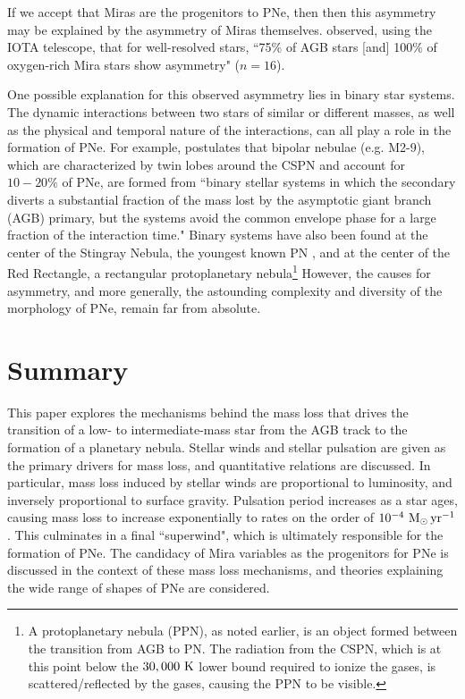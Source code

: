 \documentclass[twocolumn]{aastex63}
\begin{document}
If we accept that Miras are the progenitors to PNe, then then this asymmetry may be explained by the asymmetry of Miras themselves. \cite{ragland} observed, using the IOTA telescope, that for well-resolved stars, ``75\% of AGB stars [and] 100\% of oxygen-rich Mira stars show asymmetry" ($n=16$).

One possible explanation for this observed asymmetry lies in binary star systems. The dynamic interactions between two stars of similar or different masses, as well as the physical and temporal nature of the interactions, can all play a role in the formation of PNe. For example, \cite{soker1998} postulates that bipolar nebulae (e.g. M2-9), which are characterized by twin lobes around the CSPN and account for $10-20\%$ of PNe, are formed from ``binary stellar systems in which the secondary diverts a substantial fraction of the mass lost by the asymptotic giant branch (AGB) primary, but the systems avoid the common envelope phase for a large fraction of the interaction time." Binary systems have also been found at the center of the Stingray Nebula, the youngest known PN \citep{bobrowsky}, and at the center of the Red Rectangle, a rectangular protoplanetary nebula\footnote{A protoplanetary nebula (PPN), as noted earlier, is an object formed between the transition from AGB to PN. The radiation from the CSPN, which is at this point below the $30,000~{\rm K}$ lower bound required to ionize the gases, is scattered/reflected by the gases, causing the PPN to be visible.} \citep{cohen} However, the causes for asymmetry, and more generally, the astounding complexity and diversity of the morphology of PNe, remain far from absolute. 


\section{Summary}\label{sec:summary}

This paper explores the mechanisms behind the mass loss that drives the transition of a low- to intermediate-mass star from the AGB track to the formation of a planetary nebula. Stellar winds and stellar pulsation are given as the primary drivers for mass loss, and quantitative relations are discussed. In particular, mass loss induced by stellar winds are proportional to luminosity, and inversely proportional to surface gravity. Pulsation period increases as a star ages, causing mass loss to increase exponentially to rates on the order of $10^{-4}~{\rm M_\odot\,yr^{-1}}$. This culminates in a final ``superwind", which is ultimately responsible for the formation of PNe. The candidacy of Mira variables as the progenitors for PNe is discussed in the context of these mass loss mechanisms, and theories explaining the wide range of shapes of PNe are considered. 



\nocite{*}

\end{document}
